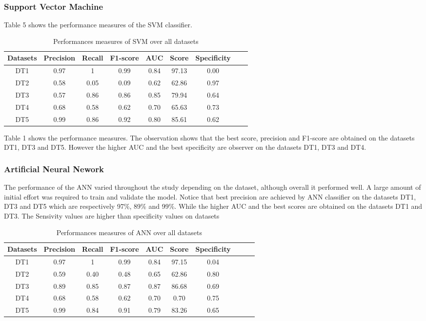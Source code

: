 \subsubsection{Support Vector Machine}

Table 5 shows the performance measures of the SVM classifier.
\begin{table}[!ht]
\centering
\begin{tabular}{*{7}{c}l r}
  \toprule
  \textbf{Datasets} & \textbf{Precision} & \textbf{Recall} & \textbf{F1-score}&\textbf{AUC} &\textbf{Score}&\textbf{Specificity}\\
   \midrule
  DT1 &0.97 &1   &0.99 &0.84 &97.13&0.00 \\
  DT2 &0.58  &0.05   & 0.09&0.62&62.86&0.97\\
  DT3 &0.57 & 0.86&0.86&0.85&79.94&0.64\\
  DT4 & 0.68&0.58&0.62&0.70&65.63&0.73\\
  DT5 &0.99 &0.86&0.92&0.80&85.61&0.62\\
    \bottomrule
\end{tabular}
\caption{Performances measures of SVM over all datasets}\label{perf-measure-dt1}
\end{table}
Table 1 shows the performance measures. The observation shows that the best score, precision and F1-score are obtained on the datasets DT1, DT3 and DT5. However the higher AUC and the best specificity are observer on the datasets DT1, DT3 and DT4.
\subsubsection{Artificial Neural Nework}
The performance of the ANN varied throughout the study depending on the dataset, although overall it performed well. A large amount of initial effort was required to train and validate the model. Notice that best precision are achieved by ANN classifier on the datasets DT1, DT3 and DT5 which are respectively 97\%, 89\% and 99\%. While the higher AUC and the best scores are obtained on the datasets DT1 and DT3. The Sensivity values are higher than specificity values on datasets 
\begin{table}[!ht]
\centering
\begin{tabular}{*{8}{c}l r}
  \toprule
  \textbf{Datasets} & \textbf{Precision} & \textbf{Recall} & \textbf{F1-score}&\textbf{AUC} &\textbf{Score}&\textbf{Specificity}\\
   \midrule
  DT1 &0.97&1 &0.99   &0.84 &97.15&0.04  \\
  DT2 &0.59  &0.40   &0.48&0.65&62.86&0.80 \\
  DT3 &0.89 &0.85 &0.87&0.87&86.68&0.69\\
  DT4 &0.68 &0.58&0.62&0.70&0.70&0.75\\
  DT5 &0.99 &0.84&0.91&0.79&83.26&0.65\\ 
    \bottomrule
\end{tabular}
\caption{Performances measures of ANN over all datasets}\label{perf-measure-dt1}
\end{table}

